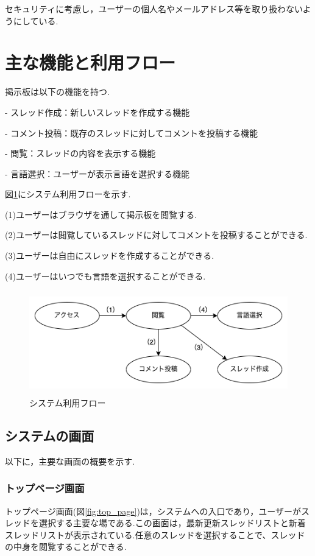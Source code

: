 \documentclass[b5paper,12pt,dvipdfmx]{jsreport}
\begin{document}
セキュリティに考慮し，ユーザーの個人名やメールアドレス等を取り扱わないようにしている.


\section{主な機能と利用フロー}

掲示板は以下の機能を持つ.

- スレッド作成：新しいスレッドを作成する機能

- コメント投稿：既存のスレッドに対してコメントを投稿する機能

- 閲覧：スレッドの内容を表示する機能

- 言語選択：ユーザーが表示言語を選択する機能

図\ref{system_usage_flow}にシステム利用フローを示す.

(1)ユーザーはブラウザを通して掲示板を閲覧する.

(2)ユーザーは閲覧しているスレッドに対してコメントを投稿することができる.

(3)ユーザーは自由にスレッドを作成することができる.

(4)ユーザーはいつでも言語を選択することができる.

\begin{figure}[H]
	\centering
	\includegraphics[width=124mm,height=45mm]{img/system_usage_flow.png}
	\caption{システム利用フロー}
    \label{system_usage_flow}
\end{figure}


\subsection{システムの画面}

以下に，主要な画面の概要を示す.


\subsubsection{トップページ画面}
トップページ画面(図\ref{fig:top_page})は，システムへの入口であり，ユーザーがスレッドを選択する主要な場である.この画面は，最新更新スレッドリストと新着スレッドリストが表示されている.任意のスレッドを選択することで、スレッドの中身を閲覧することができる.
\end{document}
